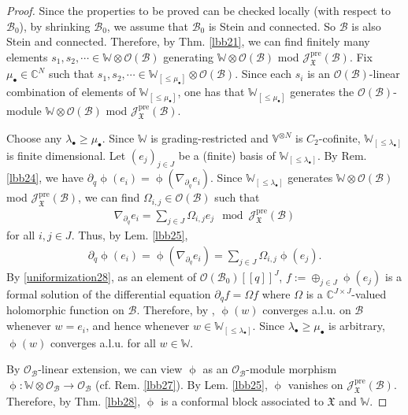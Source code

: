 \documentclass[11pt,b5paper,notitlepage]{article}
\theoremstyle{definition}
\theoremstyle{plain}
\newcommand{\mc}{\mathcal}
\newcommand{\blt}{\bullet}
\newcommand{\Vbb}{\mathbb V}
\newcommand{\Wbb}{\mathbb W}
\newcommand{\Cbb}{\mathbb C}
\newcommand{\<}{\left\langle}
\renewcommand{\>}{\right\rangle}
\newcommand{\MO}{\mathcal{O}}
\newcommand{\MB}{\mathcal{B}}
\newcommand{\fx}{\mathfrak{X}}
\newcommand{\SJ}{\mathscr{J}}
\newcommand{\pre}{\mathrm{pre}}
\numberwithin{equation}{section}
\begin{document}
\begin{proof}
Since the properties to be proved can be checked locally (with respect to $\MB_0$), by shrinking $\MB_0$, we assume that $\MB_0$ is Stein and connected. So $\MB$ is also Stein and connected. Therefore, by Thm. \ref{lbb21}, we can find finitely many elements $s_1,s_2,\cdots\in \Wbb\otimes \MO(\MB)$ generating $\Wbb\otimes \MO(\MB)$ mod $\SJ_\fx^\pre(\MB)$. Fix $\mu_\blt\in \Cbb^N$ such that $s_1,s_2,\cdots\in \Wbb_{[\leq\mu_\blt]}\otimes \MO(\MB)$. Since each $s_i$ is an $\mc O(\MB)$-linear combination of elements of $\Wbb_{[\leq\mu_\blt]}$, one has that $\Wbb_{[\leq\mu_\blt]}$ generates the $\MO(\MB)$-module $\Wbb\otimes\mc O(\MB)$ mod $\SJ_\fx^\pre(\MB)$.

Choose any $\lambda_\blt\geq \mu_\blt$. Since $\Wbb$ is grading-restricted and $\Vbb^{\otimes N}$ is $C_2$-cofinite,   $\Wbb_{[\leq\lambda_\blt]}$ is finite dimensional. Let $(e_j)_{j\in J}$ be a (finite) basis of $\Wbb_{[\leq\lambda_\blt]}$. By Rem. \ref{lbb24}, we have $\partial_q \upphi(e_i)=\upphi(\nabla_{\partial_q}e_i)$. Since $\Wbb_{[\leq\lambda_\blt]}$ generates $\Wbb\otimes\mc O(\MB)$ mod $\SJ_\fx^\pre(\MB)$, we can find $\Omega_{i,j}\in \MO(\MB)$ such that
    \begin{align}
        \nabla_{\partial_q}e_i=\sum_{j\in J}\Omega_{i,j}e_{j}\mod \SJ_\fx^\pre(\MB)
    \end{align}
for all $i,j\in J$.    Thus, by Lem. \ref{lbb25},
    \begin{align}\label{uniformization28}
        \partial_q \upphi(e_i)=\upphi(\nabla_{\partial_q}e_i)=\sum_{j\in J}\Omega_{i,j}\upphi(e_{j}).
    \end{align}
By \eqref{uniformization28}, as an element of $\mc O(\MB_0)[[q]]^J$, $f:=\oplus_{j\in J}\upphi(e_j)$  is a formal solution of the differential equation $\partial_q f=\Omega f$ where $\Omega$ is a $\Cbb^{J\times J}$-valued holomorphic function on $\MB$. Therefore, by \cite[Thm. A.1]{Gui-sewingconvergence}, $\upphi(w)$ converges a.l.u. on $\MB$ whenever $w=e_i$, and hence whenever $w\in\Wbb_{[\leq\lambda_\blt]}$. Since $\lambda_\blt\geq \mu_\blt$ is arbitrary, $\upphi(w)$ converges a.l.u. for all $w\in\Wbb$. 


By $\mc O_\MB$-linear extension, we can view $\upphi$ as an $\mc O_\MB$-module morphism $\upphi:\Wbb\otimes\mc O_\MB\rightarrow\mc O_\MB$ (cf. Rem. \ref{lbb27}). By Lem. \ref{lbb25}, $\upphi$ vanishes on $\SJ_\fx^\pre(\MB)$. Therefore, by Thm. \ref{lbb28}, $\upphi$ is a conformal block associated to $\fx$ and $\Wbb$.
\end{proof}
\end{document}
